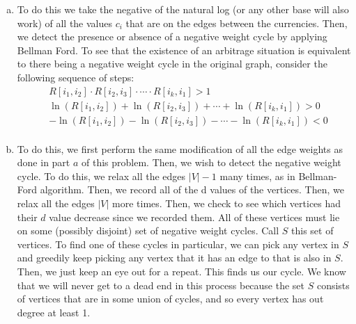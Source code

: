 \documentclass{article}
\begin{document}
\begin{enumerate}[a.]
\item
To do this we take the negative of the natural log (or any other base will also work) of all the values $c_i$ that are on the edges between the currencies. Then, we detect the presence or absence of a negative weight cycle by applying Bellman Ford. To see that the existence of an arbitrage situation is equivalent to there being a negative weight cycle in the original graph, consider the following sequence of steps:
\begin{align*}
&R[i_1,i_2]\cdot R[i_2,i_3] \cdot \cdots \cdot R[i_k,i_1] >1\\
&\ln(R[i_1,i_2])+\ln( R[i_2,i_3]) + \cdots +\ln( R[i_k,i_1]) >0\\
&-\ln(R[i_1,i_2])-\ln( R[i_2,i_3]) - \cdots -\ln( R[i_k,i_1]) <0\\
\end{align*}
\item
To do this, we first perform the same modification of all the edge weights as done in part $a$ of this problem. Then, we wish to detect the negative weight cycle. To do this, we relax all the edges $|V|-1$ many times, as in Bellman-Ford algorithm. Then, we record all of the d values of the vertices. Then, we relax all the edges $|V|$ more times. Then, we check to see which vertices had their $d$ value decrease since we recorded them. All of these vertices must lie on some (possibly disjoint) set of negative weight cycles. Call $S$ this set of vertices. To find one of these cycles in particular, we can pick any vertex in $S$ and greedily keep picking any vertex that it has an edge to that is also in $S$. Then, we just keep an eye out for a repeat. This finds us our cycle. We know that we will never get to a dead end in this process because the set $S$ consists of vertices that are in some union of cycles, and so every vertex has out degree at least 1.
\end{enumerate}
\end{document}
